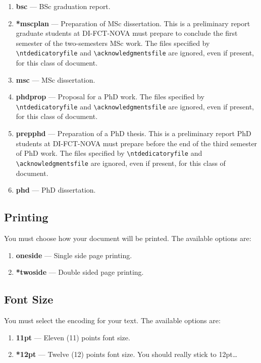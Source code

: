 \begin{enumerate}
  \item \textbf{bsc} --- BSc graduation report.
  \item \textbf{*mscplan} --- Preparation of MSc dissertation. This is a preliminary report graduate students at DI-FCT-NOVA must prepare to conclude the first semester of the two-semesters MSc work. The files specified by \verb!\ntdedicatoryfile! and \verb!\acknowledgmentsfile! are ignored, even if present, for this class of document.
  \item \textbf{msc} --- MSc dissertation.
  \item \textbf{phdprop} ---  Proposal for a PhD work. The files specified by \verb!\ntdedicatoryfile! and \verb!\acknowledgmentsfile! are ignored, even if present, for this class of document.
  \item \textbf{prepphd} ---  Preparation of a PhD thesis. This is a preliminary report PhD students at DI-FCT-NOVA must prepare before the end of the third semester of PhD work. The files specified by \verb!\ntdedicatoryfile! and \verb!\acknowledgmentsfile! are ignored, even if present, for this class of document.
  \item \textbf{phd} --- PhD dissertation.
\end{enumerate}

\subsection{Printing}
\label{sub:printing}

You must choose how your document will be printed. The available options are:
\begin{enumerate}
  \item \textbf{oneside} --- Single side page printing.
  \item \textbf{*twoside} --- Double sided page printing.
\end{enumerate}

\subsection{Font Size}
\label{ssec:font_size}

You must select the encoding for your text. The available options are:
\begin{enumerate}
  \item \textbf{11pt} --- Eleven (11) points font size.
  \item \textbf{*12pt} --- Twelve (12) points font size. You should really stick to 12pt\ldots
\end{enumerate}

